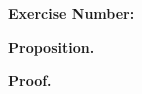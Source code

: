 \documentclass{article}
\begin{document}
\noindent \textbf{Exercise Number:   }  %

\medskip 

\noindent \textbf{Proposition.}

\bigskip

\noindent \textbf{Proof.}
\end{document}
